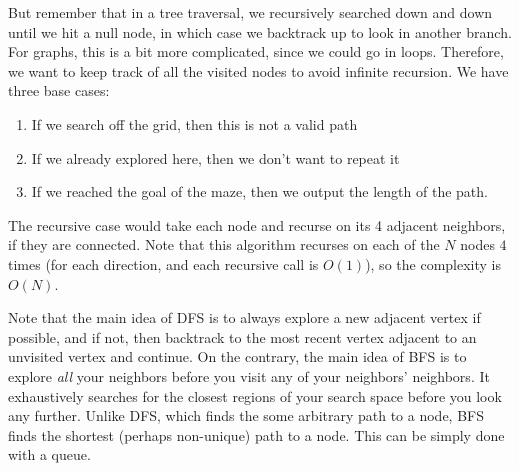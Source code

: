 \begin{example}
    But remember that in a tree traversal, we recursively searched down and down until we hit a null node, in which case we backtrack up to look in another branch. For graphs, this is a bit more complicated, since we could go in loops. Therefore, we want to keep track of all the visited nodes to avoid infinite recursion. We have three base cases: 
    \begin{enumerate}
      \item If we search off the grid, then this is not a valid path 
      \item If we already explored here, then we don't want to repeat it 
      \item If we reached the goal of the maze, then we output the length of the path. 
    \end{enumerate}
    The recursive case would take each node and recurse on its 4 adjacent neighbors, if they are connected. Note that this algorithm recurses on each of the $N$ nodes $4$ times (for each direction, and each recursive call is $O(1)$), so the complexity is $O(N)$. 
  \end{example}

  Note that the main idea of DFS is to always explore a new adjacent vertex if possible, and if not, then backtrack to the most recent vertex adjacent to an unvisited vertex and continue. On the contrary, the main idea of BFS is to explore \textit{all} your neighbors before you visit any of your neighbors' neighbors. It exhaustively searches for the closest regions of your search space before you look any further. Unlike DFS, which finds the some arbitrary path to a node, BFS finds the shortest (perhaps non-unique) path to a node. This can be simply done with a queue. 

